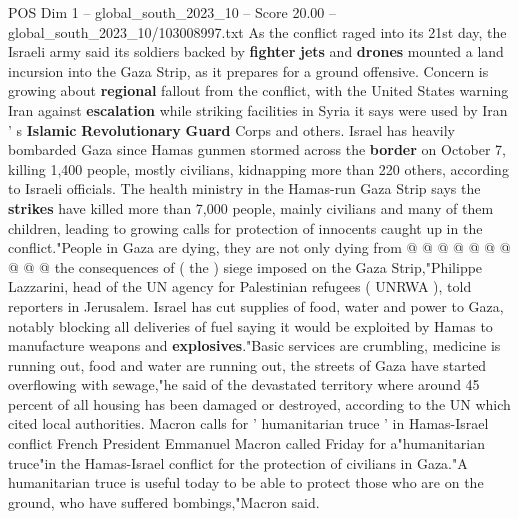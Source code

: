 \begin{textsample}{POS Dim 1 – global\_south\_2023\_10 – Score 20.00 – global\_south\_2023\_10/103008997.txt}
As the conflict raged into its 21st day, the Israeli army said its soldiers backed by \textbf{fighter} \textbf{jets} and \textbf{drones} mounted a land incursion into the Gaza Strip, as it prepares for a ground offensive.
Concern is growing about \textbf{regional} fallout from the conflict, with the United States warning Iran against \textbf{escalation} while striking facilities in Syria it says were used by Iran ' s \textbf{Islamic} \textbf{Revolutionary} \textbf{Guard} Corps and others.
Israel has heavily bombarded Gaza since Hamas gunmen stormed across the \textbf{border} on October 7, killing 1,400 people, mostly civilians, kidnapping more than 220 others, according to Israeli officials.
The health ministry in the Hamas-run Gaza Strip says the \textbf{strikes} have killed more than 7,000 people, mainly civilians and many of them children, leading to growing calls for protection of innocents caught up in the conflict."People in Gaza are dying, they are not only dying from @ @ @ @ @ @ @ @ @ @ the consequences of ( the ) siege imposed on the Gaza Strip,"Philippe Lazzarini, head of the UN agency for Palestinian refugees ( UNRWA ), told reporters in Jerusalem.
Israel has cut supplies of food, water and power to Gaza, notably blocking all deliveries of fuel saying it would be exploited by Hamas to manufacture weapons and \textbf{explosives}."Basic services are crumbling, medicine is running out, food and water are running out, the streets of Gaza have started overflowing with sewage,"he said of the devastated territory where around 45 percent of all housing has been damaged or destroyed, according to the UN which cited local authorities.
Macron calls for ' humanitarian truce ' in Hamas-Israel conflict French President Emmanuel Macron called Friday for a"humanitarian truce"in the Hamas-Israel conflict for the protection of civilians in Gaza."A humanitarian truce is useful today to be able to protect those who are on the ground, who have suffered bombings,"Macron said.

\end{textsample}
